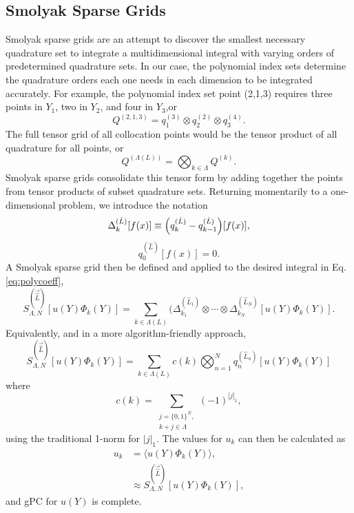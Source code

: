 \subsection{Smolyak Sparse Grids}
Smolyak sparse grids\cite{smolyak} are an attempt to discover the smallest necessary quadrature set to
integrate a multidimensional integral with varying orders of predetermined quadrature sets.  In our case, the
polynomial index sets determine the quadrature orders each one needs in each dimension to be integrated
accurately.  For example, the polynomial index set point (2,1,3) requires three points in $Y_1$, two in $Y_2$,
and four in $Y_3$,or
\begin{equation}
  Q^{(2,1,3)} = q^{(3)}_1 \otimes q^{(2)}_2 \otimes q^{(4)}_3.
\end{equation}
The full tensor grid of all collocation points would be the tensor product of all quadrature for all points,
or
\begin{equation}
  Q^{(\Lambda(L))} = \bigotimes_{k\in\Lambda}Q^{(k)}.
\end{equation}
Smolyak sparse grids consolidate this tensor form by adding together the points from tensor products of subset
quadrature sets.  Returning momentarily to a one-dimensional problem, we introduce the notation
\begin{equation}
  \Delta_k^{(\hat L)}[f(x)] \equiv \qty(q_k^{(\hat L)} - q_{k-1}^{(\hat L)})[f(x)],
\end{equation}
\begin{equation}
  q_0^{(\hat L)}[f(x)] = 0.
\end{equation}
A Smolyak sparse grid then be defined and applied to the desired integral in Eq. \ref{eq:polycoeff},
\begin{equation}
  S^{(\vec{\hat L})}_{\Lambda,N}[u(Y)\Phi_k(Y)] = \sum_{k\in\Lambda(L)} (\Delta_{k_1}^{(\hat L_1)} \otimes \cdots \otimes
  \Delta_{k_N}^{(\hat L_N)}[u(Y)\Phi_k(Y)].
\end{equation}
Equivalently, and in a more algorithm-friendly approach,
\begin{equation}
  S^{(\vec{\hat L})}_{\Lambda,N}[u(Y)\Phi_k(Y)] = \sum_{k\in\Lambda(L)} c(k)\bigotimes_{n=1}^N
  q^{(\hat L_n)}_n[u(Y)\Phi_k(Y)]
\end{equation}
where
\begin{equation}
  c(k) = \sum_{\substack{j=\{0,1\}^N,\\k+j\in\Lambda}} (-1)^{|j|_1},
\end{equation}
using the traditional 1-norm for $|j|_1$.
The values for $u_k$ can then be calculated as
\begin{align}
  u_k &= \langle u(Y)\Phi_k(Y) \rangle,\\
      &\approx S^{(\vec{\hat L})}_{\Lambda,N}[u(Y)\Phi_k(Y)],
\end{align}
and gPC for $u(Y)$ is complete.




